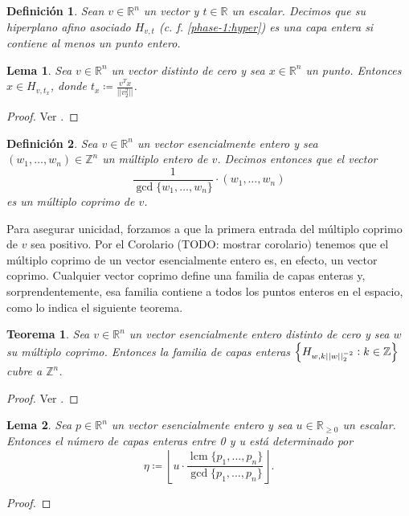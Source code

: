 \documentclass[11pt]{article}
\newtheorem{definition}{Definición}
\newtheorem{theorem}{Teorema}
\newtheorem{lemma}{Lema}
\DeclareMathOperator{\lcm}{lcm}
\begin{document}
\begin{definition}
	Sean $v \in \mathbb{R}^n$ un vector y $t \in \mathbb{R}$ un escalar. Decimos que su hiperplano
	afino asociado $H_{v, t}$ (c. f. \ref{phase-1:hyper}) es una capa entera si contiene al menos un
	punto entero.
\end{definition}

\begin{lemma}
	Sea $v \in \mathbb{R}^n$ un vector distinto de cero y sea $x \in \mathbb{R}^n$ un punto.
	Entonces $x \in H_{v, t_x}$, donde $t_x \coloneq \frac{v^Tx}{||v_2^2||}$.
\end{lemma}
\begin{proof}
	Ver \cite{sip}.
\end{proof}

\begin{definition}
	Sea $v \in \mathbb{R}^n$ un vector esencialmente entero y sea $(w_1, \ldots, w_n) \in
	\mathbb{Z}^n$ un múltiplo entero de $v$. Decimos entonces que el vector
	\begin{equation*}
		\frac{1}{\gcd\lbrace w_1, \ldots, w_n\rbrace} \cdot (w_1, \ldots, w_n)
	\end{equation*}
	es un múltiplo coprimo de $v$.
\end{definition}

Para asegurar unicidad, forzamos a que la primera entrada del múltiplo coprimo de $v$ sea positivo.
Por el Corolario (TODO: mostrar corolario)  tenemos que el múltiplo coprimo de un vector
esencialmente entero es, en efecto, un vector coprimo. Cualquier vector coprimo define una familia
de capas enteras y, sorprendentemente, esa familia contiene a todos los puntos enteros en el
espacio, como lo indica el siguiente teorema.
\begin{theorem}
	\label{phase-1:th:family}
	Sea $v \in \mathbb{R}^n$ un vector esencialmente entero distinto de cero y sea $w$ su múltiplo
	coprimo. Entonces la familia de capas enteras $\left\lbrace H_{w, k||w||_2^{-2}} \vcentcolon k
	\in \mathbb{Z} \right\rbrace$ cubre a $\mathbb{Z}^n$.
\end{theorem}
\begin{proof}
	Ver \cite{sip}.
\end{proof}

\begin{lemma}
	\label{phase-1:num-layers}
	Sea $p \in \mathbb{R}^n$ un vector esencialmente entero y sea $u \in
	\mathbb{R}_{\geq 0}$ un escalar. Entonces el número de capas enteras entre 0 y u está
	determinado por
	\begin{equation}
		\label{eq:num_layers}
		\eta \coloneq
		\left\lfloor
			u \cdot \frac{\lcm\lbrace p_1, \ldots, p_n \rbrace}{\gcd\lbrace p_1, \ldots, p_n \rbrace}
		\right\rfloor.
	\end{equation}
\end{lemma}
\begin{proof}
\end{proof}
\end{document}
